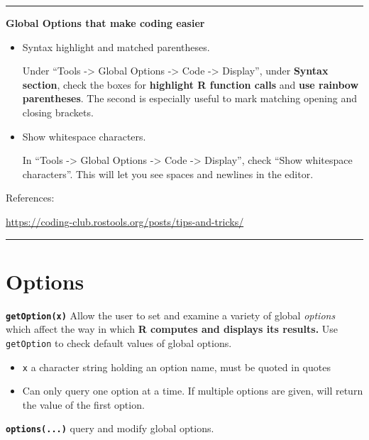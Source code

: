\documentclass[
]{book}
\providecommand{\tightlist}{%
  \setlength{\itemsep}{0pt}\setlength{\parskip}{0pt}}
\theoremstyle{definition}
\theoremstyle{definition}
\theoremstyle{definition}
\theoremstyle{definition}
\theoremstyle{remark}
\begin{document}
\begin{center}\rule{0.5\linewidth}{0.5pt}\end{center}

\textbf{Global Options that make coding easier}

\begin{itemize}
\item
  Syntax highlight and matched parentheses.

  Under ``Tools -\textgreater{} Global Options -\textgreater{} Code -\textgreater{} Display'', under \textbf{Syntax section}, check the boxes for \textbf{highlight R function calls} and \textbf{use rainbow parentheses}. The second is especially useful to mark matching opening and closing brackets.
\item
  Show whitespace characters.

  In ``Tools -\textgreater{} Global Options -\textgreater{} Code -\textgreater{} Display'', check ``Show whitespace characters''. This will let you see spaces and newlines in the editor.
\end{itemize}

References:

\url{https://coding-club.rostools.org/posts/tips-and-tricks/}

\begin{center}\rule{0.5\linewidth}{0.5pt}\end{center}

\section{Options}\label{options}

\textbf{\texttt{getOption(x)}} Allow the user to set and examine a variety of global \emph{options} which affect the way in which \textbf{R computes and displays its results.} Use \texttt{getOption} to check default values of global options.

\begin{itemize}
\tightlist
\item
  \texttt{x} a {character string }holding an option name, must be {quoted in quotes}
\item
  Can only query one option at a time. If multiple options are given, will return the value of the first option.
\end{itemize}

\textbf{\texttt{options(...)}} query and modify global options.
\end{document}
